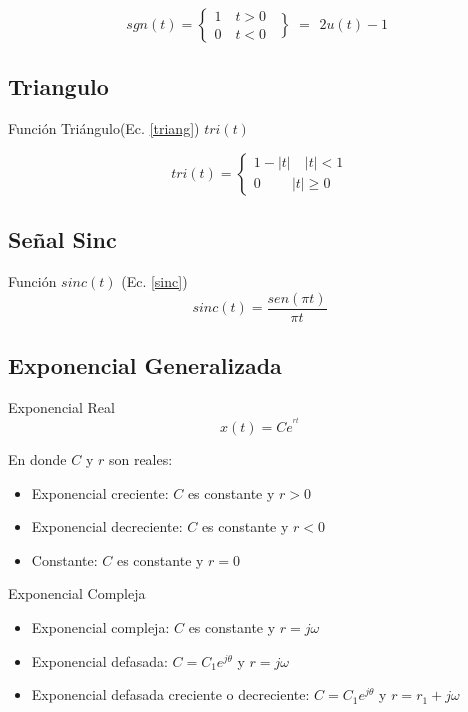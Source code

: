 \documentclass[10pt,a4paper]{report}
\begin{document}
\begin{equation}
sgn(t)=
\left\{
\begin{aligned}
1\quad t>0\\
0\quad t<0\
\end{aligned}
\right.
\left\}=
\begin{aligned}
2u(t)-1
\end{aligned}
\right.
\label{signo}
\end{equation}

%
\subsection{Triangulo}
Función Triángulo(Ec. \ref{triang}) $tri(t)$

\begin{equation}
tri(t)=
\left\{
\begin{aligned}
1-|t|\quad |t|<1\\
0\qquad\:|t|\geq0\
\end{aligned}
\right.
\label{triang}
\end{equation}



%
\subsection{Señal Sinc}
Función $sinc(t)$ (Ec. \ref{sinc})\\
\begin{equation}
sinc(t)=\frac{sen(\pi t)}{\pi t}
\label{sinc}
\end{equation}
%
\subsection{Exponencial Generalizada}
Exponencial Real
\begin{equation*}
x(t)=Ce^{^{rt}}
\end{equation*}

En donde $C$ y $r$ son reales:
\begin{itemize}
\item Exponencial creciente: \quad $C$ es constante y $r >0$
\item  Exponencial decreciente: $C$ es constante y $r <0$
\item Constante: \qquad \qquad \qquad$C$ es constante y $r =0$
\end{itemize}
Exponencial Compleja
\begin{itemize}
\item Exponencial compleja: \quad$C$ es constante y $r=j\omega$
\item Exponencial defasada: \quad$C=C_{1}e^{j\theta}$ y $r =j\omega$
\item Exponencial defasada creciente o decreciente: \quad $C=C_{1}e^{j\theta}$ y $r =r_{1}+j\omega$
\end{itemize}
\end{document}
